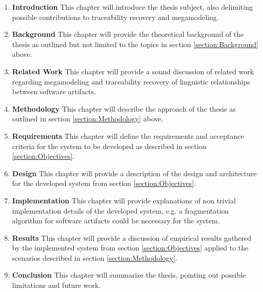 \documentclass[runningheads,a4paper]{llncs}
\begin{document}
\begin{enumerate}

\item
\textbf{Introduction}
This chapter will introduce the thesis subject, also delimiting possible contributions to traceability recovery and megamodeling.

\item
\textbf{Background}
This chapter will provide the theoretical background of the thesis as outlined but not limited to the topics in section \ref{section:Background} above.

\item
\textbf{Related Work}
This chapter will provide a sound discussion of related work regarding megamodeling and traceability recovery of linguistic relationships between software artifacts.

\item
\textbf{Methodology}
This chapter will describe the approach of the thesis as outlined in section \ref{section:Methodology} above.

\item
\textbf{Requirements}
This chapter will define the requirements and acceptance criteria for the system to be developed as described in section \ref{section:Objectives}.

\item
\textbf{Design}
This chapter will provide a description of the design and architecture for the developed system from section \ref{section:Objectives}.

\item
\textbf{Implementation}
This chapter will provide explanations of non trivial implementation details of the developed system, e.g. a fragmentation algorithm for software artifacts could be necessary for the system.

\item
\textbf{Results}
This chapter will provide a discussion of empirical results gathered by the implemented system from section \ref{section:Objectives} applied to the scenarios described in section \ref{section:Methodology}.

\item
\textbf{Conclusion}
This chapter will summarize the thesis, pointing out possible limitations and future work.

\end{enumerate}






{}

\end{document}
